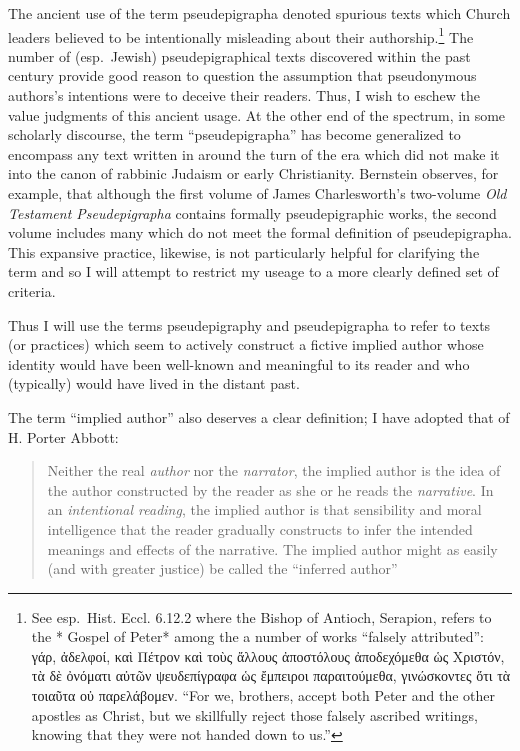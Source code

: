 The ancient use of the term pseudepigrapha denoted spurious texts which
Church leaders believed to be intentionally misleading about their
authorship.\footnote{See esp.~Hist. Eccl. 6.12.2 where the Bishop of
  Antioch, Serapion, refers to the * Gospel of Peter* among the a number
  of works ``falsely attributed'': γάρ, ἀδελφοί, καὶ Πέτρον καὶ τοὺς
  ἄλλους ἀποστόλους ἀποδεχόμεθα ὡς Χριστόν, τὰ δὲ ὀνόματι αὐτῶν
  ψευδεπίγραφα ὡς ἔμπειροι παραιτούμεθα, γινώσκοντες ὅτι τὰ τοιαῦτα οὐ
  παρελάβομεν. ``For we, brothers, accept both Peter and the other
  apostles as Christ, but we skillfully reject those falsely ascribed
  writings, knowing that they were not handed down to us.''} The number
of (esp.~Jewish) pseudepigraphical texts discovered within the past
century provide good reason to question the assumption that pseudonymous
authors's intentions were to deceive their
readers.\autocites[53--58]{mroczek2016}[See also][]{reed_jts2009} Thus,
I wish to eschew the value judgments of this ancient usage. At the other
end of the spectrum, in some scholarly discourse, the term
``pseudepigrapha'' has become generalized to encompass any text written
in around the turn of the era which did not make it into the canon of
rabbinic Judaism or early Christianity. Bernstein observes, for example,
that although the first volume of James Charlesworth's two-volume
\emph{Old Testament Pseudepigrapha} contains formally pseudepigraphic
works, the second volume includes many which do not meet the formal
definition of
pseudepigrapha.\autocites[2]{bernstein_chazon-etal1999}{charlesworth_OTP}
This expansive practice, likewise, is not particularly helpful for
clarifying the term and so I will attempt to restrict my useage to a
more clearly defined set of criteria.

Thus I will use the terms pseudepigraphy and pseudepigrapha to refer to
texts (or practices) which seem to actively construct a fictive implied
author whose identity would have been well-known and meaningful to its
reader and who (typically) would have lived in the distant past.

The term ``implied author'' also deserves a clear definition; I have
adopted that of H. Porter Abbott:

\begin{quote}
Neither the real \emph{author} nor the \emph{narrator}, the implied
author is the idea of the author constructed by the reader as she or he
reads the \emph{narrative}. In an \emph{intentional reading}, the
implied author is that sensibility and moral intelligence that the
reader gradually constructs to infer the intended meanings and effects
of the narrative. The implied author might as easily (and with greater
justice) be called the ``inferred author'' \autocite[235]{abbott2008}
\end{quote}

